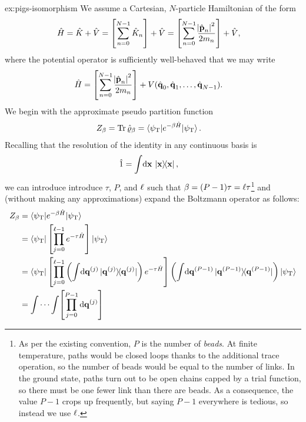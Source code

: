 \begin{DefAnswer}{ex:pigs-isomorphism}
	We assume a Cartesian, $N$-particle Hamiltonian of the form
	\begin{align}
		\hat{H}
		&= \hat{K} + \hat{V}
		= \left[ \sum_{n=0}^{N-1} \hat{K}_n \right] + \hat{V}
		= \left[ \sum_{n=0}^{N-1} \frac{\abs{\hat{\bm{\mathbf{p}}}_n}^2}{2 m_n} \right] + \hat{V},
	\end{align}
	where the potential operator is sufficiently well-behaved that we may write
	\begin{align}
		\hat{H}
		&= \left[ \sum_{n=0}^{N-1} \frac{\abs{\hat{\bm{\mathbf{p}}}_n}^2}{2 m_n} \right]
			+ V(\hat{\bm{\mathbf{q}}}_0, \hat{\bm{\mathbf{q}}}_1, \ldots, \hat{\bm{\mathbf{q}}}_{N-1}).
	\end{align}
	We begin with the approximate pseudo partition function
	\begin{align}
		Z_\beta
		&= \operatorname{Tr}{\hat{\varrho}_\beta}
		= \braket{\psi_\mathrm{T} | e^{-\beta \hat{H}} | \psi_\mathrm{T}}.
	\end{align}
	Recalling that the resolution of the identity in any continuous basis is
	\begin{align}
		\hat{1}
		&= \int\! \dif \vec{x} \, \ketbraself{\vec{x}},
	\end{align}
	we can introduce introduce $\tau$, $P$, and $\ell$ such that $\beta = (P-1) \tau = \ell \tau$\footnote{
		As per the existing convention, $P$ is the number of \emph{beads}.
		At finite temperature, paths would be closed loops thanks to the additional trace operation, so the number of beads would be equal to the number of links.
		In the ground state, paths turn out to be open chains capped by a trial function, so there must be one fewer link than there are beads.
		As a consequence, the value $P - 1$ crops up frequently, but saying $P - 1$ everywhere is tedious, so instead we use $\ell$.
	} and (without making any approximations) expand the Boltzmann operator as follows:
	\begin{subequations}
	\begin{align}
		Z_\beta
		&= \braket{\psiT | e^{-\beta \hat{H}} | \psiT} \\
		&= \braket{\psiT | \left[ \prod_{j=0}^{\links - 1} e^{-\tau \hat{H}} \right] | \psiT} \\
		&= \bra{\psiT}
			\left[
				\prod_{j=0}^{\links - 1}
					\left( \int\! \dif \vec{q}\bead{j} \ketbraself{\vec{q}\bead{j}} \right)
					e^{-\tau \hat{H}}
			\right]
			\left( \int\! \dif \vec{q}\bead{P-1} \ketbraself{\vec{q}\bead{P-1}} \right)
			\ket{\psiT} \\
		&= \idotsint\! \left[ \prod_{j=0}^{P-1} \dif \vec{q}\bead{j} \right]

\end{align}
\end{subequations}
\end{DefAnswer}
